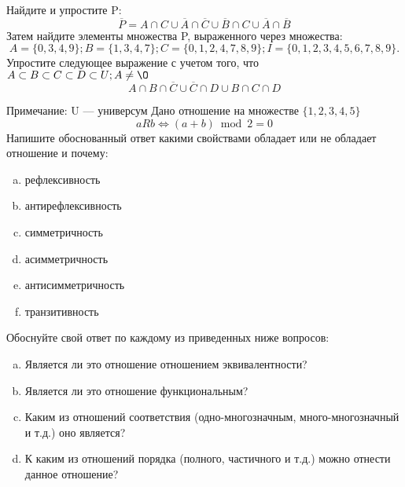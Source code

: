 \documentclass[10pt]{exam}
\begin{document}
\begin{questions}
\question
Найдите и упростите P:
\begin{equation*}
\overline{P} = A \cap C \cup \overline{A} \cap \overline{C} \cup \overline{B} \cap C \cup \overline{A} \cap \overline{B}
\end{equation*}
Затем найдите элементы множества P, выраженного через множества:
\begin{equation*}
A = \{0, 3, 4, 9\}; 
B = \{1, 3, 4, 7\};
C = \{0, 1, 2, 4, 7, 8, 9\};
I = \{0, 1, 2, 3, 4, 5, 6, 7, 8, 9\}.
\end{equation*}\question
Упростите следующее выражение с учетом того, что $A\subset B \subset C \subset D \subset U; A \neq \O$
\begin{equation*}
A \cap B  \cap \overline{C} \cup \overline{C} \cap D \cup B \cap C \cap D
\end{equation*}

Примечание: U — универсум\question
Дано отношение на множестве $\{1, 2, 3, 4, 5\}$ 
\begin{equation*}
aRb \iff (a+b) \bmod 2 =0
\end{equation*}
Напишите обоснованный ответ какими свойствами обладает или не обладает отношение и почему:   
\begin{enumerate} [a)]\setcounter{enumi}{0}
\item рефлексивность
\item антирефлексивность
\item симметричность
\item асимметричность
\item антисимметричность
\item транзитивность
\end{enumerate}

Обоснуйте свой ответ по каждому из приведенных ниже вопросов:
\begin{enumerate} [a)]\setcounter{enumi}{0}
    \item Является ли это отношение отношением эквивалентности?
    \item Является ли это отношение функциональным?
    \item Каким из отношений соответствия (одно-многозначным, много-многозначный и т.д.) оно является?
    \item К каким из отношений порядка (полного, частичного и т.д.) можно отнести данное отношение?
\end{enumerate}




\end{questions}
\end{document}
